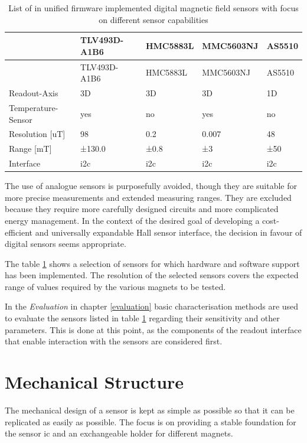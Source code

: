 \begin{longtable}[]{@{}lllll@{}}
\caption{List of in unified firmware implemented digital magnetic field
sensors with focus on different sensor capabilities
\label{List_of_in_unified_firmware_implemented_digital_magnetic_field_sensors_with_focus_on_different_sensor_capabilities.csv}}\tabularnewline
\toprule
& TLV493D-A1B6 & HMC5883L & MMC5603NJ & AS5510\tabularnewline
\midrule
\endfirsthead
\toprule
& TLV493D-A1B6 & HMC5883L & MMC5603NJ & AS5510\tabularnewline
\midrule
\endhead
Readout-Axis & 3D & 3D & 3D & 1D\tabularnewline
Temperature-Sensor & yes & no & yes & no\tabularnewline
Resolution {[}uT{]} & 98 & 0.2 & 0.007 & 48\tabularnewline
Range {[}mT{]} & ±130.0 & ±0.8 & ±3 & ±50\tabularnewline
Interface & \gls{i2c} & \gls{i2c} & \gls{i2c} & \gls{i2c}\tabularnewline
\bottomrule
\end{longtable}

The use of analogue sensors is purposefully avoided, though they are
suitable for more precise measurements and extended measuring ranges.
They are excluded because they require more carefully designed circuits
and more complicated energy management. In the context of the desired
goal of developing a cost-efficient and universally expandable Hall
sensor interface, the decision in favour of digital sensors seems
appropriate.

The table
\ref{List_of_in_unified_firmware_implemented_digital_magnetic_field_sensors_with_focus_on_different_sensor_capabilities.csv}
shows a selection of sensors for which hardware and software support has
been implemented. The resolution of the selected sensors covers the
expected range of values required by the various magnets to be tested.

In the \emph{Evaluation} in chapter \ref{evaluation} basic
characterisation methods are used to evaluate the sensors listed in
table
\ref{List_of_in_unified_firmware_implemented_digital_magnetic_field_sensors_with_focus_on_different_sensor_capabilities.csv}
regarding their sensitivity and other parameters. This is done at this
point, as the components of the readout interface that enable
interaction with the sensors are considered first.

\hypertarget{mechanical-structure}{%
\section{Mechanical Structure}\label{mechanical-structure}}

The mechanical design of a sensor is kept as simple as possible so that
it can be replicated as easily as possible. The focus is on providing a
stable foundation for the sensor \gls{ic} and an exchangeable holder for
different magnets.

